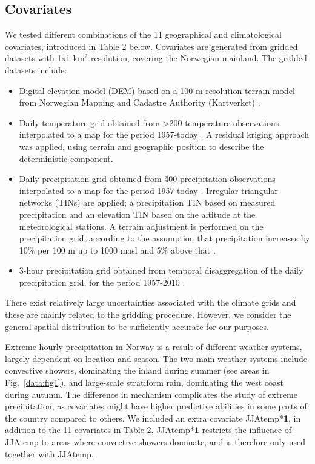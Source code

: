 \documentclass[12pt,a4paper,english]{article}
\begin{document}
\subsection{Covariates}

We tested different combinations of the 11 geographical and climatological covariates, introduced in Table 2 below. Covariates are generated from gridded datasets with 1x1 km$^2$ resolution, covering the Norwegian mainland. The gridded datasets include:  

\begin{itemize} 
\item Digital elevation model (DEM) based on a 100 m resolution terrain model from Norwegian Mapping and Cadastre Authority (Kartverket) \citep{Mohr2009}.
\item Daily temperature grid obtained from >200 temperature observations interpolated to a map for the period 1957-today \citep{Tveitoetal2002, Mohr2009, Janssonetal2007}. A residual kriging approach was applied, using terrain and geographic position to describe the deterministic component.
\item Daily precipitation grid obtained from \~400 precipitation observations interpolated to a map for the period 1957-today \citep{Tveitoetal2002, Mohr2009, Janssonetal2007}. Irregular triangular networks (TINs) are applied; a precipitation TIN based on measured precipitation  and an elevation TIN based on the altitude at the meteorological stations. A terrain adjustment is performed on the precipitation grid, according to the assumption that precipitation increases by 10\% per 100 m up to 1000 masl and 5\% above that \citep{Forland1979,Forland1984b}.
\item 3-hour precipitation grid obtained from temporal disaggregation of the daily precipitation grid, for the period 1957-2010 \citep{VormoorandSkaugen2013}.
\end{itemize}

\noindent There exist relatively large uncertainties associated with the climate grids and these are mainly related to the gridding procedure. However, we consider the general spatial distribution to be sufficiently accurate for our purposes.

Extreme hourly precipitation in Norway is a result of different weather systems, largely dependent on location and season. The two main weather systems include convective showers, dominating the inland during summer (see areas in Fig.~\ref{data:fig1}), and large-scale stratiform rain, dominating the west coast during autumn. The difference in mechanism complicates the study of extreme precipitation, as covariates might have higher predictive abilities in some parts of the country compared to others. We included an extra covariate JJAtemp*\textbf{1}, in addition to the 11 covariates in Table 2. JJAtemp*\textbf{1} restricts the influence of JJAtemp to areas where convective showers dominate, and is therefore only used together with JJAtemp. 
\end{document}
